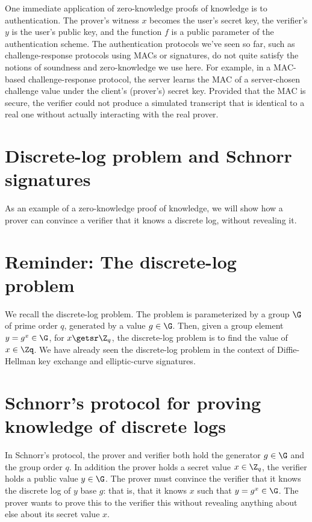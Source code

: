 One immediate application of zero-knowledge proofs of knowledge is to authentication.
The prover's witness $x$ becomes the user's secret key,
the verifier's $y$ is the user's public key, and the
function $f$ is a public parameter of the authentication scheme.
The authentication protocols we've seen so far, such as challenge-response protocols using MACs or signatures,
do not quite satisfy the notions of soundness and zero-knowledge we use here.
For example, in a MAC-based challenge-response protocol, 
the server learns the MAC of a
server-chosen challenge value under the client's (prover's) secret key.
Provided that the MAC is secure, the verifier could not 
produce a simulated transcript that is identical to a
real one without actually interacting with the real prover.

\section{Discrete-log problem and Schnorr signatures}

As an example of a zero-knowledge proof of knowledge, we will show
how a prover can convince a verifier that it knows a discrete
log, without revealing it. 

\section{Reminder: The discrete-log problem}
We recall the discrete-log problem.
The problem is parameterized by 
a group $\G$ of prime order $q$,
generated by a value $g \in \G$.
Then, given a group element $y = g^x \in \G$, for $x \getsr \Z_q$,
the discrete-log problem is to find the value of $x\in \Zq$.
We have already seen the discrete-log problem in
the context of Diffie-Hellman key exchange and elliptic-curve signatures.


\section{Schnorr's protocol for proving knowledge of discrete logs}

In Schnorr's protocol, the prover and verifier both hold the
generator $g \in \G$ and the group order $q$.
In addition the prover holds a secret value $x \in \Z_q$, the verifier
holds a public value $y \in \G$.
The prover must convince the verifier that it knows the discrete log of $y$
base $g$: that is, that it knows $x$ such that $y=g^x \in \G$.
The prover wants to prove this to the verifier this without revealing
anything about else about its secret value $x$.

